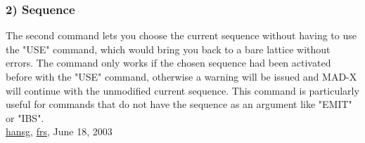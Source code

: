 \subsubsection{2) Sequence} The second command lets you choose the current sequence without having to use the "USE" command, which would bring you back to a bare lattice without errors. The command only works if the chosen sequence had been activated before with the "USE" command, otherwise a warning will be issued and MAD-X will continue with the unmodified current sequence. This command is particularly useful for commands that do not have the sequence as an argument like "EMIT" or "IBS".
\\
 \href{http://www.cern.ch/Hans.Grote/hansg_sign.html}{hansg}, \href{http://www.cern.ch/Frank.Frank/frs_sign.html}{frs}, June 18, 2003 

